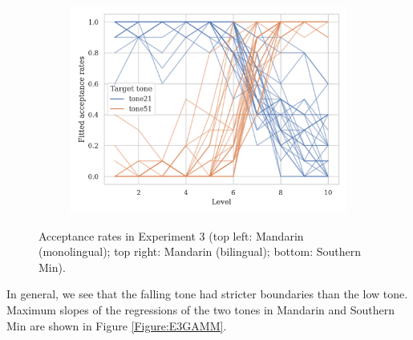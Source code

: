 \begin{figure}[hbt!]
\begin{subfigure}[b]{.45\textwidth}
\includegraphics[width=\textwidth]{figures/E3/Min_E3_raw.png}
\end{subfigure}
\caption{Acceptance rates in Experiment 3 (top left: Mandarin (monolingual); top right: Mandarin (bilingual); bottom: Southern Min).}
\label{Figure:E3Raw}
\end{figure}

In general, we see that the falling tone had stricter boundaries than the low tone. Maximum slopes of the regressions of the two tones in Mandarin and Southern Min are shown in Figure \ref{Figure:E3GAMM}.

